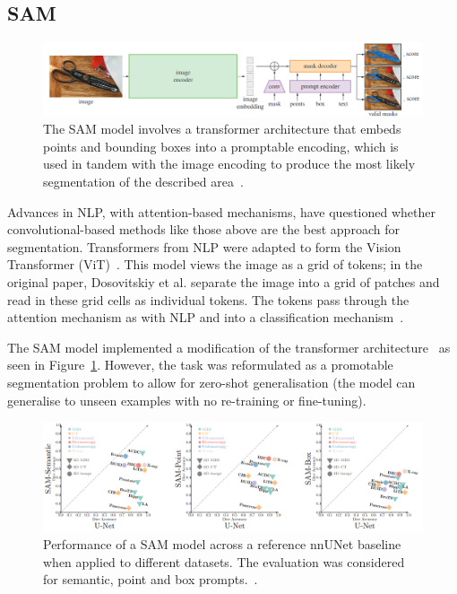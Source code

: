 \documentclass[12pt,twoside]{report}
\begin{document}

\subsection{SAM}\label{sect:sam}

\begin{figure}
  \centering
  \includegraphics[width=1\linewidth]{../figures/SAM.png}
  \caption{The SAM model involves a transformer architecture that embeds points and bounding boxes into a promptable encoding, which is used in tandem with the image encoding to produce the most likely segmentation of the described area~\cite{SAM}.}\label{fig:sam}
\end{figure}

Advances in NLP, with attention-based mechanisms, have questioned whether convolutional-based methods like those above are the best approach for segmentation. Transformers from NLP were adapted to form the Vision Transformer (ViT)~\cite{ViT}. This model views the image as a grid of tokens; in the original paper, Dosovitskiy et al. separate the image into a grid of patches and read in these grid cells as individual tokens. The tokens pass through the attention mechanism as with NLP and into a classification mechanism~\cite{ViT}. 

The SAM model implemented a modification of the transformer architecture~\cite{SAM} as seen in Figure~\ref{fig:sam}. However, the task was reformulated as a promotable segmentation problem to allow for zero-shot generalisation (the model can generalise to unseen examples with no re-training or fine-tuning).

\begin{figure}
  \centering
  \includegraphics[width=1\linewidth]{../figures/sam-performance.png}
  \caption{Performance of a SAM model across a reference nnUNet baseline when applied to different datasets. The evaluation was considered for semantic, point and box prompts.~\cite{he2023computervision}.}\label{fig:sam-performance}
\end{figure}
\end{document}
